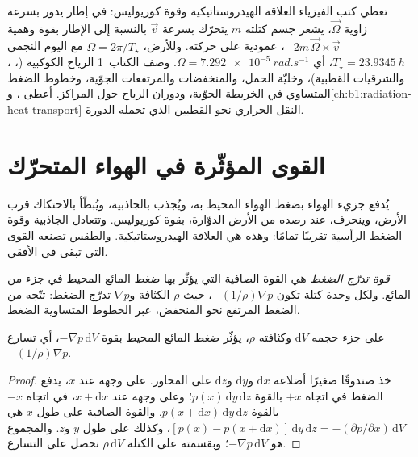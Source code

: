 \begin{recall}
تعطي كتب الفيزياء العلاقة الهيدروستاتيكية وقوة كوريوليس: في إطار يدور بسرعة زاوية $\vec\Omega$، يشعر جسم كتلته $m$ يتحرّك بسرعة $\vec v$ بالنسبة إلى الإطار بقوة وهمية $-2m\,\vec\Omega\times\vec v$، عمودية على حركته. وللأرض، $\Omega = 2\pi/T_\star$ مع اليوم النجمي $T_\star = \qty{23.9345}{h}$، أي $\Omega = \qty{7.292e-5}{rad.s^{-1}}$. وصف الكتاب~1 الرياح الكوكبية (، ، والشرقيات القطبية)، وخليّة الحمل، والمنخفضات والمرتفعات الجوّية، وخطوط الضغط المتساوي في الخريطة الجوّية، ودوران الرياح حول المراكز.  أعطى  ، و\cref{ch:b1:radiation-heat-transport} النقل الحراري نحو القطبين الذي تحمله الدورة.
\end{recall}

\section{القوى المؤثّرة في الهواء المتحرّك}\label{sec:b1:atmospheric-circulation:forces}

يُدفع جزيء الهواء بضغط الهواء المحيط به، ويُجذب بالجاذبية، ويُبطّأ بالاحتكاك قرب الأرض، وينحرف، عند رصده من الأرض الدوّارة، بقوة كوريوليس. وتتعادل الجاذبية وقوة الضغط الرأسية تقريبًا تمامًا: وهذه هي العلاقة الهيدروستاتيكية. والطقس تصنعه القوى التي تبقى في الأفقي.

\begin{definition}\label{def:b1:atmospheric-circulation:pgf}
\emph{قوة تدرّج الضغط} هي القوة الصافية التي يؤثّر بها ضغط المائع المحيط في جزء من المائع. ولكل وحدة كتلة تكون $-(1/\rho)\nabla p$، حيث $\rho$ الكثافة و$\nabla p$ تدرّج الضغط: تتّجه من الضغط المرتفع نحو المنخفض، عبر الخطوط المتساوية الضغط.
\end{definition}

\begin{proposition}\label{prop:b1:atmospheric-circulation:pgf}
على جزء حجمه $\mathrm dV$ وكثافته $\rho$، يؤثّر ضغط المائع المحيط بقوة $-\nabla p\,\mathrm dV$، أي تسارع $-(1/\rho)\nabla p$.
\end{proposition}

\begin{proof}
خذ صندوقًا صغيرًا أضلاعه $\mathrm dx$ و$\mathrm dy$ و$\mathrm dz$ على المحاور. على وجهه عند $x$، يدفع الضغط في اتجاه $+x$ بالقوة $p(x)\,\mathrm dy\,\mathrm dz$؛ وعلى وجهه عند $x + \mathrm dx$، في اتجاه $-x$ بالقوة $p(x + \mathrm dx)\,\mathrm dy\,\mathrm dz$. والقوة الصافية على طول $x$ هي $[p(x) - p(x + \mathrm dx)]\,\mathrm dy\,\mathrm dz = -(\partial p/\partial
x)\,\mathrm dV$، وكذلك على طول $y$ و$z$. والمجموع هو $-\nabla p\,
\mathrm dV$؛ وبقسمته على الكتلة $\rho\,\mathrm dV$ نحصل على التسارع.
\end{proof}

